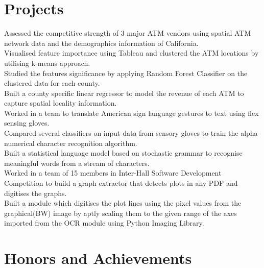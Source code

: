 \documentclass[11pt,a4paper,sans]{moderncv}        %
\begin{document}
\section{Projects}
{Assessed the competitive strength of 3 major ATM vendors using spatial ATM network data and the demographics information of California. \\
Visualised feature importance using Tableau and clustered the ATM locations by utilising k-means approach. \\
Studied the features significance by applying Random Forest Classifier on the clustered data for each county. \\
Built a county specific linear regressor to model the revenue of each ATM to capture spatial locality information. \\}
\vspace{-2mm}
{Worked in a team to translate American sign language gestures to text using flex sensing gloves. \\
Compared several classifiers on input data from sensory gloves to train the alpha-numerical character recognition algorithm. \\
Built a statistical language model based on stochastic grammar to recognise meaningful words from a stream of characters. \\ }
\vspace{-2mm}
{Worked in a team of 15 members in Inter-Hall Software Development Competition to build a graph extractor that detects plots in any PDF and digitises the graphs. \\
Built a module which digitises the plot lines using the pixel values from the graphical(BW) image by aptly scaling them to the given range of the axes imported from the OCR module using Python Imaging Library. }
\vspace{-2mm}
\section{Honors and Achievements}
\vspace{-2mm}
\end{document}
